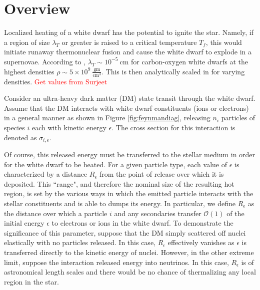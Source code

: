 \documentclass[11 pt, preprint,preprintnumbers,amsmath,amssymb, prd]{revtex4}
\newcommand{\OO}{\mathcal{O}}
\begin{document}
\section{Overview}

Localized heating of a white dwarf has the potential to ignite the star. Namely, if a region of size $\lambda_T$ or greater is raised to a critical temperature $T_f$, this would initiate runaway thermonuclear fusion and cause the white dwarf to explode in a supernovae. According to \cite{Woosley}, $\lambda_T \sim 10^{-5} ~\text{cm}$ for carbon-oxygen white dwarfs at the highest densities $\rho \sim 5 \times 10^9 ~\frac{\text{gm}}{\text{cm}^3}$. This is then analytically scaled in \cite{Varela} for varying densities. \textcolor{red}{Get values from Surjeet}

Consider an ultra-heavy dark matter (DM) state transit through the white dwarf. Assume that the DM interacts with white dwarf constituents (ions or electrons) in a general manner as shown in Figure \ref{fig:feynmandiag}, releasing $n_i$ particles of species $i$ each with kinetic energy $\epsilon$. The cross section for this interaction is denoted as $\sigma_{i,\epsilon}$.  

Of course, this released energy must be transferred to the stellar medium in order for the white dwarf to be heated. For a given particle type, each value of $\epsilon$ is characterized by a distance $R_\epsilon$ from the point of release over which it is deposited. This ``range", and therefore the nominal size of the resulting hot region, is set by the various ways in which the emitted particle interacts with the stellar constituents and is able to dumps its energy. In particular, we define $R_\epsilon$ as the distance over which a particle $i$ and any secondaries transfer $\OO(1)$ of the initial energy $\epsilon$ to electrons or ions in the white dwarf. To demonstrate the significance of this parameter, suppose that the DM simply scattered off nuclei elastically with no particles released. In this case, $R_\epsilon$ effectively vanishes as $\epsilon$ is transferred directly to the kinetic energy of nuclei. However, in the other extreme limit, suppose the interaction released energy into neutrinos. In this case, $R_\epsilon$ is of astronomical length scales and there would be no chance of thermalizing any local region in the star. 
\end{document}
